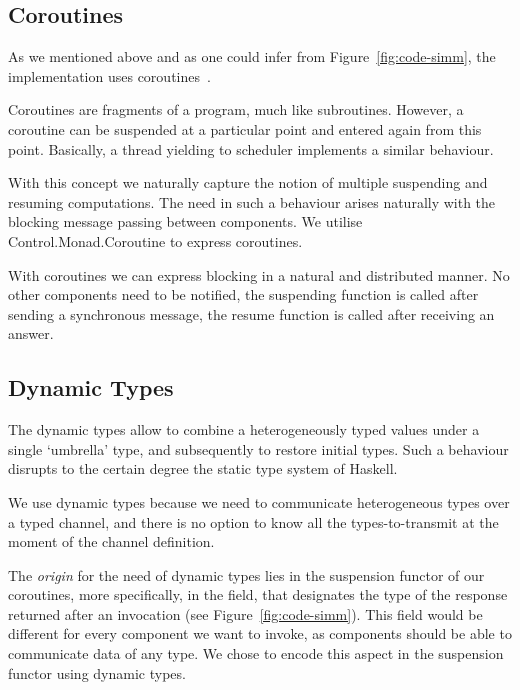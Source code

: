 \subsection{Coroutines}
\label{sec:impl-coroutines}
As we mentioned above and as one could infer from Figure~\ref{fig:code-simm}, the implementation uses coroutines~\cite{coroutines}.

Coroutines are fragments of a program, much like subroutines. 
However, a coroutine can be suspended at a particular point and entered again from this point. 
Basically, a thread yielding to scheduler implements a similar behaviour.

With this concept we naturally capture the notion of multiple suspending and resuming computations.
The need in such a behaviour arises naturally with the blocking message passing between components.
We utilise \textsf{Control.Monad.Coroutine} \cite{cmt} to express coroutines.

With coroutines we can express blocking in a natural and distributed manner.
No other components need to be notified, the suspending function is called after sending a synchronous message, the resume function is called after receiving an answer.

\subsection{Dynamic Types}
The dynamic types \cite{Abadi:1991:DTS:103135.103138} allow to combine
a heterogeneously typed values under a single `umbrella' type, and
subsequently to restore initial types. Such a behaviour disrupts to
the certain degree the static type system of Haskell.

We use dynamic types %
because 
we need to communicate heterogeneous types over a typed channel, and there is no option to know all the types-to-transmit at the moment of the channel definition.

The \emph{origin} for the need of dynamic types lies in the suspension functor of our coroutines, more specifically, in the  field, that designates the type of the response returned after an invocation (see Figure~\ref{fig:code-simm}).
This field would be different for every component we want to invoke, as components should be able to communicate data of any type. %
We chose to encode this aspect in the suspension functor using dynamic types.

